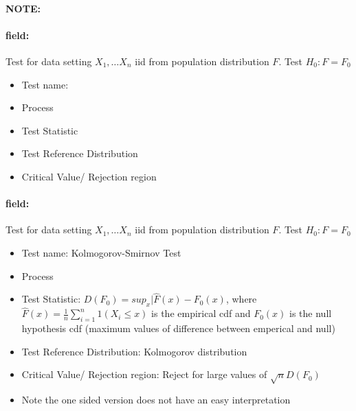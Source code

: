 \documentclass[12pt]{article}
\newenvironment{note}{\paragraph{NOTE:}}{}
\newenvironment{field}{\paragraph{field:}}{}
\begin{document}
\begin{note}
  \begin{field}
    Test for data setting $X_1, \ldots X_n$ iid from population distribution $F$. Test $H_0: F = F_0$
    \begin{itemize}
      \item Test name:
      \item Process
      \item Test Statistic
      \item Test Reference Distribution
      \item Critical Value/ Rejection region
    \end{itemize}
  \end{field}
  \begin{field}
    Test for data setting $X_1, \ldots X_n$ iid from population distribution $F$. Test $H_0: F = F_0$
    \begin{itemize}
      \item Test name: Kolmogorov-Smirnov Test
      \item Process
      \item Test Statistic: $D(F_0) = sup_x|\hat{F}(x) - F_0(x)$, where $\hat{F}(x) = \frac{1}{n}\sum_{i=1}^n 1(X_i \leq x)$ is the empirical cdf and $F_0(x)$ is the null hypothesis cdf (maximum values of difference between emperical and null)
      \item Test Reference Distribution: Kolmogorov distribution
      \item Critical Value/ Rejection region: Reject for large values of $\sqrt{n}D(F_0)$
      \item Note the one sided version does not have an easy interpretation
    \end{itemize}
  \end{field}
\end{note}
\end{document}
